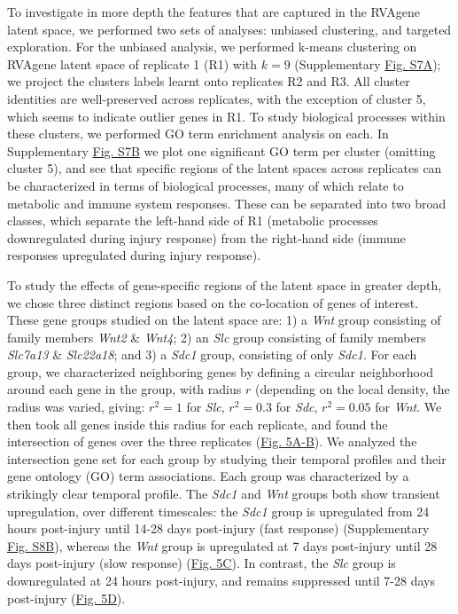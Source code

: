 {
  To investigate in more depth the features that are captured in the RVAgene latent space, we performed two sets of analyses: unbiased clustering, and targeted exploration. For the unbiased analysis, we performed k-means clustering on RVAgene latent space of replicate 1 (R1) with $k=9$ (Supplementary \hyperref[supp]{Fig. S7A}); we project the clusters labels learnt onto replicates R2 and R3. All cluster identities are well-preserved across replicates, with the exception of cluster 5, which seems to indicate outlier genes in R1. To study biological processes within these clusters, we performed GO term enrichment analysis on each. In Supplementary  \hyperref[supp]{Fig. S7B} we plot one significant GO term per cluster (omitting cluster 5), and see that specific regions of the latent spaces across replicates can be characterized in terms of biological processes, many of which relate to metabolic and immune system responses. These can be separated into two broad classes, which separate the left-hand side of R1 (metabolic processes downregulated during injury response) from the right-hand side (immune responses upregulated during injury response). 
}
\par 
To study the effects of gene-specific regions of the latent space in greater depth, we chose three distinct regions based on the co-location of genes of interest. These gene groups studied on the latent space are: 1) a {\em Wnt} group consisting of family members {\em Wnt2} \& {\em Wnt4}; 2) an {\em Slc} group consisting of family members {\em Slc7a13} \& {\em Slc22a18}; and 3) a {\em Sdc1} group, consisting of only {\em Sdc1}. For each group, we characterized neighboring genes by defining a circular neighborhood around each gene in the group, with radius $r$ (depending on the local density, the radius was varied, giving: $r^2 = 1$ for {\em Slc}, $r^2 = 0.3$ for {\em Sdc}, $r^2 = 0.05$ for {\em Wnt}. We then took all genes inside this radius for each replicate, and found the intersection of genes over the three replicates (\hyperref[fig:fig6b]{Fig. 5A-B}). We analyzed the intersection gene set for each group by studying their temporal profiles and their gene ontology (GO) term associations. Each group was characterized by a strikingly clear temporal profile. The {\em Sdc1} and {\em Wnt} groups both show transient upregulation, over different timescales: the {\em Sdc1} group is upregulated from 24 hours post-injury until 14-28 days post-injury (fast response) (Supplementary \hyperref[supp]{Fig. S8B}), whereas the {\em Wnt} group is upregulated at 7 days post-injury until 28 days post-injury (slow response) (\hyperref[fig:fig6b]{Fig. 5C}). In contrast, the {\em Slc} group is downregulated at 24 hours post-injury, and remains suppressed until 7-28 days post-injury (\hyperref[fig:fig6b]{Fig. 5D}).
